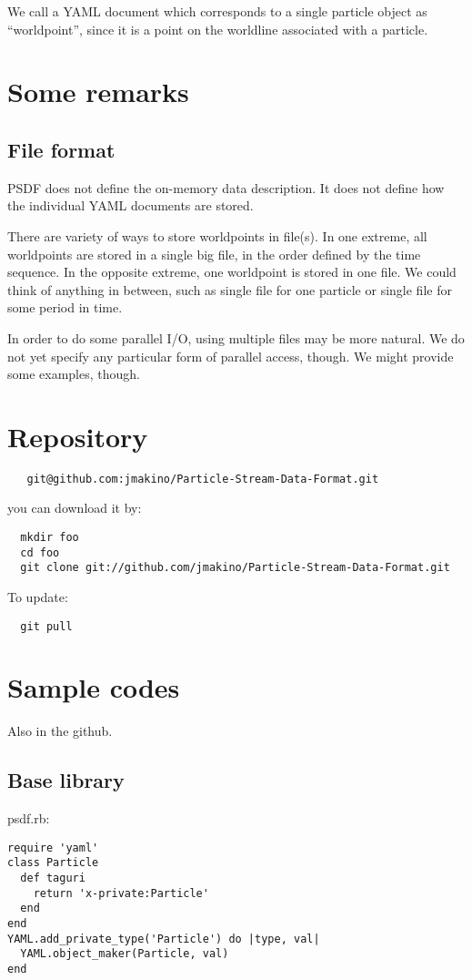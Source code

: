 \documentclass[5p,authoryear]{elsarticle}
\begin{document}
We call a YAML document which corresponds to a single particle object
as ``worldpoint'', since it is a point on the worldline associated
with a particle. 


\section{Some remarks}

\subsection{File format}
PSDF does not define the on-memory data description. It does not
define how the individual YAML documents are stored.

There are variety of ways to store worldpoints in file(s). In one
extreme, all worldpoints are stored in a single big file, in the order
defined by the time sequence. In the opposite extreme, one worldpoint is
stored in one file. We could think of anything in between, such as
single file for one particle or single file for some period in time.

In order to do some parallel I/O, using multiple files may be more
natural. We do not yet specify any particular form of parallel access,
though. We might provide some examples, though.


\section{Repository}


\begin{verbatim}
   git@github.com:jmakino/Particle-Stream-Data-Format.git
\end{verbatim}

you can download it by:
\begin{verbatim}
  mkdir foo
  cd foo
  git clone git://github.com/jmakino/Particle-Stream-Data-Format.git
\end{verbatim}

To update:

\begin{verbatim}
  git pull
\end{verbatim}
  
\section{Sample codes}
Also in the github.

\subsection{Base library}
psdf.rb:
\begin{verbatim}
require 'yaml'
class Particle
  def taguri
    return 'x-private:Particle'
  end
end
YAML.add_private_type('Particle') do |type, val|
  YAML.object_maker(Particle, val)
end
\end{verbatim}
\end{document}
